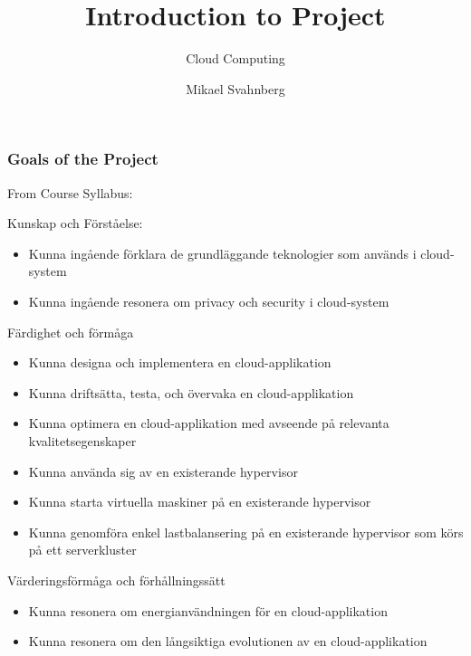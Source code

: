 \documentclass[10pt]{beamer}
\title[]{Introduction to Project}
\subtitle{Cloud Computing}
\author[Mikael Svahnberg]{Mikael Svahnberg\inst{1}}
\institute[BTH] %
{
  \inst{1}%
 Mikael.Svahnberg@bth.se\\
 School of Computing\\
 Blekinge Institute of Technology%
}
\begin{document}
\begin{frame}
  \titlepage
\end{frame}



\begin{frame}[t]
\frametitle{Goals of the Project}

From Course Syllabus:
\vspace{0.5cm}

\begin{scriptsize}
Kunskap och Förståelse:
\begin{itemize}
\item Kunna ingående förklara de grundläggande teknologier som används i cloud-system
\item Kunna ingående resonera om privacy och security i cloud-system
\end{itemize}

Färdighet och förmåga
\begin{itemize}
\item Kunna designa och implementera en cloud-applikation
\item Kunna driftsätta, testa, och övervaka en cloud-applikation
\item Kunna optimera en cloud-applikation med avseende på relevanta kvalitetsegenskaper
\item Kunna använda sig av en existerande hypervisor
\item Kunna starta virtuella maskiner på en existerande hypervisor
\item Kunna genomföra enkel lastbalansering på en existerande hypervisor som körs på ett serverkluster
\end{itemize}

Värderingsförmåga och förhållningssätt

\begin{itemize} 
\item Kunna resonera om energianvändningen för en cloud-applikation
\item Kunna resonera om den långsiktiga evolutionen av en cloud-applikation
\end{itemize}
\end{scriptsize}
\end{frame}
\end{document}
